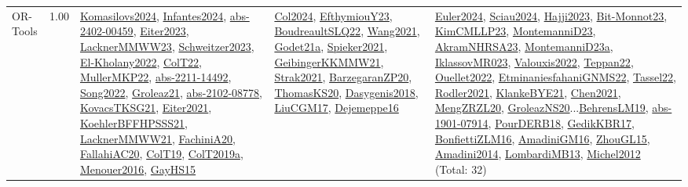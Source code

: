 {\begin{longtable}{p{3cm}r>{\raggedright\arraybackslash}p{6cm}>{\raggedright\arraybackslash}p{6cm}>{\raggedright\arraybackslash}p{8cm}}
\index{OR-Tools}\index{CPSystems!OR-Tools}OR-Tools &  1.00 & \hyperref[detail:Komasilovs2024]{Komasilovs2024}, \hyperref[detail:Infantes2024]{Infantes2024}, \hyperref[detail:abs-2402-00459]{abs-2402-00459}, \hyperref[detail:Eiter2023]{Eiter2023}, \hyperref[detail:LacknerMMWW23]{LacknerMMWW23}, \hyperref[detail:Schweitzer2023]{Schweitzer2023}, \hyperref[detail:El-Kholany2022]{El-Kholany2022}, \hyperref[detail:ColT22]{ColT22}, \hyperref[detail:MullerMKP22]{MullerMKP22}, \hyperref[detail:abs-2211-14492]{abs-2211-14492}, \hyperref[detail:Song2022]{Song2022}, \hyperref[detail:Groleaz21]{Groleaz21}, \hyperref[detail:abs-2102-08778]{abs-2102-08778}, \hyperref[detail:KovacsTKSG21]{KovacsTKSG21}, \hyperref[detail:Eiter2021]{Eiter2021}, \hyperref[detail:KoehlerBFFHPSSS21]{KoehlerBFFHPSSS21}, \hyperref[detail:LacknerMMWW21]{LacknerMMWW21}, \hyperref[detail:FachiniA20]{FachiniA20}, \hyperref[detail:FallahiAC20]{FallahiAC20}, \hyperref[detail:ColT19]{ColT19}, \hyperref[detail:ColT2019a]{ColT2019a}, \hyperref[detail:Menouer2016]{Menouer2016}, \hyperref[detail:GayHS15]{GayHS15} & \hyperref[detail:Col2024]{Col2024}, \hyperref[detail:EfthymiouY23]{EfthymiouY23}, \hyperref[detail:BoudreaultSLQ22]{BoudreaultSLQ22}, \hyperref[detail:Wang2021]{Wang2021}, \hyperref[detail:Godet21a]{Godet21a}, \hyperref[detail:Spieker2021]{Spieker2021}, \hyperref[detail:GeibingerKKMMW21]{GeibingerKKMMW21}, \hyperref[detail:Strak2021]{Strak2021}, \hyperref[detail:BarzegaranZP20]{BarzegaranZP20}, \hyperref[detail:ThomasKS20]{ThomasKS20}, \hyperref[detail:Dasygenis2018]{Dasygenis2018}, \hyperref[detail:LiuCGM17]{LiuCGM17}, \hyperref[detail:Dejemeppe16]{Dejemeppe16} & \hyperref[detail:Euler2024]{Euler2024}, \hyperref[detail:Sciau2024]{Sciau2024}, \hyperref[detail:Hajji2023]{Hajji2023}, \hyperref[detail:Bit-Monnot23]{Bit-Monnot23}, \hyperref[detail:KimCMLLP23]{KimCMLLP23}, \hyperref[detail:MontemanniD23]{MontemanniD23}, \hyperref[detail:AkramNHRSA23]{AkramNHRSA23}, \hyperref[detail:MontemanniD23a]{MontemanniD23a}, \hyperref[detail:IklassovMR023]{IklassovMR023}, \hyperref[detail:Valouxis2022]{Valouxis2022}, \hyperref[detail:Teppan22]{Teppan22}, \hyperref[detail:Ouellet2022]{Ouellet2022}, \hyperref[detail:EtminaniesfahaniGNMS22]{EtminaniesfahaniGNMS22}, \hyperref[detail:Tassel22]{Tassel22}, \hyperref[detail:Rodler2021]{Rodler2021}, \hyperref[detail:KlankeBYE21]{KlankeBYE21}, \hyperref[detail:Chen2021]{Chen2021}, \hyperref[detail:MengZRZL20]{MengZRZL20}, \hyperref[detail:GroleazNS20]{GroleazNS20}...\hyperref[detail:BehrensLM19]{BehrensLM19}, \hyperref[detail:abs-1901-07914]{abs-1901-07914}, \hyperref[detail:PourDERB18]{PourDERB18}, \hyperref[detail:GedikKBR17]{GedikKBR17}, \hyperref[detail:BonfiettiZLM16]{BonfiettiZLM16}, \hyperref[detail:AmadiniGM16]{AmadiniGM16}, \hyperref[detail:ZhouGL15]{ZhouGL15}, \hyperref[detail:Amadini2014]{Amadini2014}, \hyperref[detail:LombardiMB13]{LombardiMB13}, \hyperref[detail:Michel2012]{Michel2012} (Total: 32)\\

\end{longtable}}
